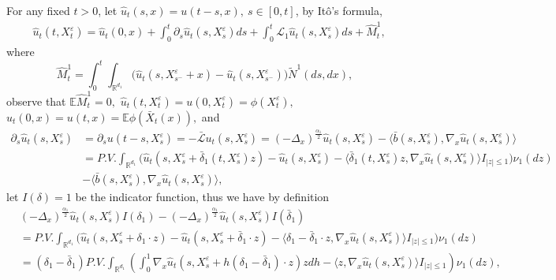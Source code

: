 \documentclass[11pt,reqno]{amsart}
\numberwithin{equation}{section}
\begin{document}
For any fixed $t>0$, let $\hat{u}_{t}(s,x)=u(t-s,x),\ s\in [0,t]$, by It\^{o}'s formula, 
\begin{equation}\label{6.13}
	\begin{split}
		&\hat{u}_{t}(t,X_{t}^{\varepsilon})=\hat{u}_{t}(0,x)+\int_{0}^{t}\partial_{s}\hat{u}_{t}(s,X_{s}^{\varepsilon})ds+\int_{0}^{t}\mathcal{L}_{1}\hat{u}_{t}(s,X_{s}^{\varepsilon})ds+\hat{M}^{1}_{t},
	\end{split}
\end{equation}
where $$\hat{M}^{1}_{t}=\int_{0}^{t}\int_{\mathbb{R}^{d_{1}}}\Big( \hat{u}_{t}(s,X_{s^{-}}^{\varepsilon}+x)-\hat{u}_{t}(s,X_{s^{-}}^{\varepsilon})\Big)\tilde{N}^{1}(ds,dx), $$
observe that $ \mathbb{E}\hat{M}^{1}_{t}=0,$ $\hat{u}_{t}(t,X_{t}^{\varepsilon})=u(0,X_{t}^{\varepsilon})=\phi(X_{t}^{\varepsilon}),$ $\hat{u}_{t}(0,x)=u(t,x)=\mathbb{E}\phi(\bar{X}_{t}(x)),$ and
\begin{align*}
\partial_{s}\hat{u}_{t}(s,X_{s}^{\varepsilon})&=\partial_{s}u(t-s,X_{s}^{\varepsilon})=-\mathcal{\bar{L}}u_{t}(s,X_{s}^{\varepsilon})=(-\Delta_{x})^{\frac{\alpha_{1}}{2}}\hat{u}_{t}(s,X_{s}^{\varepsilon})-\langle  \bar{b}(s,X_{s}^{\varepsilon}),\nabla_{x}\hat{u}_{t}(s,X_{s}^{\varepsilon})\rangle \\
&=P.V.\int_{\mathbb{R}^{d_{1}}}\Big(\hat{u}_{t}(s,X_{s}^{\varepsilon}+\bar{\delta}_{1}(t,X_{s}^{\varepsilon})z)-\hat{u}_{t}(s,X_{s}^{\varepsilon})-\langle \bar{\delta}_{1}(t,X_{s}^{\varepsilon})z,\nabla_{x}\hat{u}_{t}(s,X_{s}^{\varepsilon})\rangle I_{|z|\leq1}\Big)\nu_{1}(dz)\\
&-\langle  \bar{b}(s,X_{s}^{\varepsilon}),\nabla_{x}\hat{u}_{t}(s,X_{s}^{\varepsilon})\rangle ,
\end{align*}
let $I(\delta)=1$ be the indicator function, thus we have by definition
\begin{align*}
&(-\Delta_{x})^{\frac{\alpha_{1}}{2}}\hat{u}_{t}(s,X_{s}^{\varepsilon})I(\delta_{1})-(-\Delta_{x})^{\frac{\alpha_{1}}{2}}\hat{u}_{t}(s,X_{s}^{\varepsilon})I(\bar{\delta}_{1})\\
&=P.V.\int_{\mathbb{R}^{ d_{1}}}\Big(\hat{u}_{t}(s,X_{s}^{\varepsilon}+\delta_{1}\cdot z)-\hat{u}_{t}(s,X_{s}^{\varepsilon}+\bar{\delta}_{1}\cdot z)-\langle \delta_{1}-\bar{\delta}_{1}\cdot z,\nabla_{x}\hat{u}_{t}(s,X_{s}^{\varepsilon})\rangle I_{|z|\leq1} \Big)\nu_{1}(dz)\\
&=(\delta_{1}-\bar{\delta}_{1})P.V.\int_{\mathbb{R}^{ d_{1}}}\left(\int_{0}^{1}\nabla_{x}\hat{u}_{t}(s,X_{s}^{\varepsilon}+h(\delta_{1}-\bar{\delta}_{1})\cdot z)zdh-\langle  z,\nabla_{x}\hat{u}_{t}(s,X_{s}^{\varepsilon})\rangle I_{|z|\leq1} \right)\nu_{1}(dz),
\end{align*}
\end{document}
